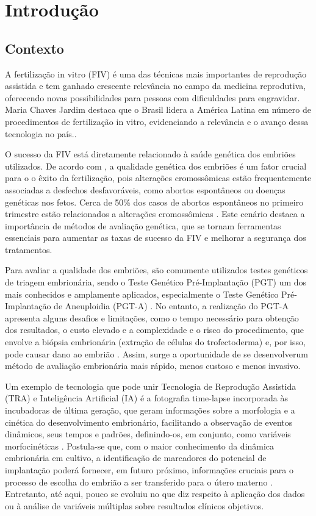\chapter[Introdução]{Introdução}

\section{Contexto}

A fertilização in vitro (FIV) é uma das técnicas mais importantes de reprodução assistida e tem ganhado crescente relevância no campo da medicina reprodutiva, oferecendo novas possibilidades para pessoas com dificuldades para engravidar. Maria Chaves Jardim destaca que o Brasil lidera a América Latina em número de procedimentos de fertilização in vitro, evidenciando a relevância e o avanço dessa tecnologia no país.\cite{jardim2023}. 

O sucesso da FIV está diretamente relacionado à saúde genética dos embriões utilizados. De acordo com , a qualidade genética dos embriões é um fator crucial para o o êxito da fertilização, pois alterações cromossômicas estão frequentemente associadas a desfechos desfavoráveis, como abortos espontâneos ou doenças genéticas nos fetos. Cerca de 50\% dos casos de abortos espontâneos no primeiro trimestre estão relacionados a alterações cromossômicas \cite{silva2023}. Este cenário destaca a importância de métodos de avaliação genética, que se tornam ferramentas essenciais para aumentar as taxas de sucesso da FIV e melhorar a segurança dos tratamentos.

Para avaliar a qualidade dos embriões, são comumente utilizados testes genéticos de triagem embrionária, sendo o Teste Genético Pré-Implantação (PGT) um dos mais conhecidos e amplamente aplicados, especialmente o Teste Genético Pré-Implantação de Aneuploidia (PGT-A) \cite{yang2024}. No entanto, a realização do PGT-A apresenta alguns desafios e limitações, como o tempo necessário para obtenção dos resultados, o custo elevado e a complexidade e o risco do procedimento, que envolve a biópsia embrionária (extração de células do trofectoderma) e, por isso, pode causar dano ao embrião \cite{yang2024}. Assim, surge a oportunidade de se desenvolverum método de avaliação embrionária mais rápido, menos custoso e menos invasivo.

Um exemplo de tecnologia que pode unir Tecnologia de Reprodução Assistida (TRA) e Inteligência Artificial (IA) é a fotografia time-lapse incorporada às incubadoras de última geração, que geram informações sobre a morfologia e a cinética do desenvolvimento embrionário, facilitando a observação de eventos dinâmicos, seus tempos e padrões, definindo-os, em conjunto, como variáveis morfocinéticas \cite{meseguer2011}. Postula-se que, com o maior conhecimento da dinâmica embrionária em cultivo, a identificação de marcadores do potencial de implantação poderá fornecer, em futuro próximo, informações cruciais para o processo de escolha do embrião a ser transferido para o útero materno \cite{luong2023}. Entretanto, até aqui, pouco se evoluiu no que diz respeito à aplicação dos dados ou à análise de variáveis múltiplas sobre resultados clínicos objetivos.

